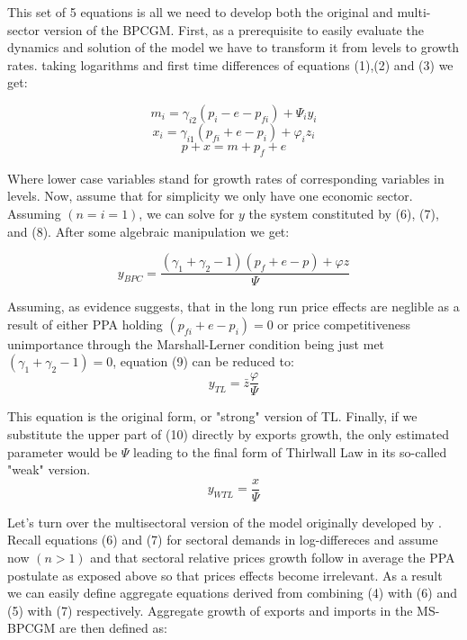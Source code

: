 \documentclass{article}
\begin{document}
This set of 5 equations is all we need to develop both the original and multi-sector version of the BPCGM. First, as a prerequisite to easily evaluate the dynamics and solution of the model we have to transform it from levels to growth rates.  taking logarithms and first time differences of equations (1),(2) and (3) we get:

\begin{equation}
  m_i= \gamma_{i2}(p_i-e-p_{fi}) +\Psi_i y_i
\end{equation}
\begin{equation}
  x_i= \gamma _{i1}\left(p_{fi}+e-p_i\right)+\varphi_i z_i
\end{equation}
\begin{equation}
p + x  =m+p_{\mathit{f}}+e
\end{equation}

Where lower case variables stand for growth rates of corresponding variables in levels. Now, assume that for simplicity we only have one economic sector. Assuming $(n=i=1)$, we can solve for $y$ the system constituted by (6), (7), and (8). After some algebraic manipulation we get:

\begin{equation}
  y_{BPC}= \frac{ (\gamma_1 +\gamma_2 -1) (p_{f}+e-p)+  \varphi z }{\Psi}
\end{equation}

Assuming, as evidence suggests, that in the long run price effects are neglible as a result of either PPA holding $(p_{fi}+e-p_i)=0$ or price competitiveness unimportance through the Marshall-Lerner condition being just met $(\gamma_1 +\gamma_2 -1)=0$, equation (9) can be reduced to:
\begin{equation}
  y_{TL}= \bar{z} \frac{  \varphi  } {\Psi}
\end{equation}

This equation is the original form, or "strong" version of TL. Finally, if we substitute the upper part of (10) directly by exports growth, the only estimated parameter would be $\Psi$ leading to the final form of Thirlwall Law in its so-called "weak" version.
\begin{equation}
  y_{WTL}=\frac{x}{\Psi}
\end{equation}

Let's turn over the multisectoral version of the model originally developed by \cite{araujo2007}. Recall equations (6) and (7) for sectoral demands in log-differeces and assume now $(n>1)$ and that sectoral relative prices  growth follow in average the PPA postulate as exposed above so that prices effects become irrelevant. As a result we can easily define aggregate equations derived from combining (4) with (6) and (5) with (7) respectively. Aggregate growth of exports and imports in the MS-BPCGM are then defined as:
\end{document}
